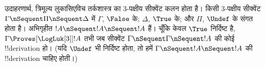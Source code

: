\documentclass[../../../include/open-logic-section]{subfiles}
\begin{document}
उदाहरणार्थ, त्रिमूल्य लुकासिएविच तर्कशास्त्र का $3$-पक्षीय सीक्वेंट कलन
होता है। किसी $3$-पक्षीय सीक्वेंट
$\Gamma \nSequent \Pi \nSequent \Delta$ में $\Gamma$, $\False$ के;
$\Delta$, $\True$ के; और $\Pi$, $\Undef$ के संगत होता है। अभिगृहीत
$!A \nSequent !A \nSequent !A$ हैं। चूँकि केवल $\True$ निर्दिष्ट है,
$\Gamma \Proves[\LogLuk[3]] !A$ तभी जब सीक्वेंट
$\Gamma \nSequent \Gamma \nSequent !A$ की कोई !!{derivation} हो।
(यदि $\Undef$ भी निर्दिष्ट होता, तो हमें
$\Gamma \nSequent !A \nSequent !A$ की !!{derivation} चाहिए होती।)
\end{document}
